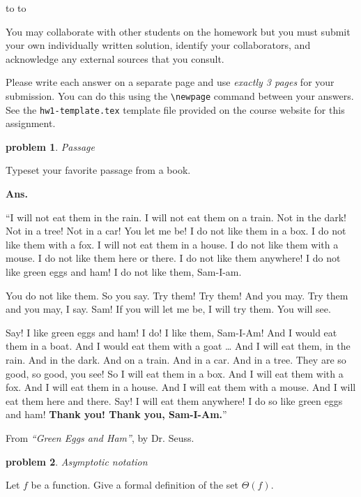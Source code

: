 \documentclass[11pt]{article}
\newcommand{\handout}{
   \renewcommand{\thepage}{H\hnumber-\arabic{page}}%
   \noindent%
   \begin{center}%
      \vbox{%
    \hbox to \columnwidth {\sc{\course} --- abhi shelat \hfill}%
    \vspace{-2mm}%
    \hbox to \columnwidth {\sc due \MakeLowercase{\duedate} \duelocation\hfill {\Huge\color{mdb}H\hnumber.\yourname}}%
      }
   \end{center}
   \vspace*{2mm}
}
\newtheorem{problem}{\sc\color{cit}problem}
\begin{document}
\handout

\noindent You may collaborate with other students on the homework but you must submit your own individually written solution, identify your collaborators, and acknowledge any external sources that you consult.

Please write each answer on a separate page and use \emph{exactly 3 pages} for your submission. You can do this using the \verb=\newpage= command between your answers.  See the \texttt{hw1-template.tex} template file provided on the course website for this assignment.

\begin{problem}Passage\end{problem}
\noindent Typeset your favorite passage from a book.

\hfill

\noindent \textbf{Ans.}
\hfill

``I will not eat them in the rain.
I will not eat them on a train.
Not in the dark! Not in a tree!
Not in a car! You let me be!
I do not like them in a box.
I do not like them with a fox.
I will not eat them in a house.
I do not like them with a mouse.
I do not like them here or there.
I do not like them anywhere!
I do not like green eggs and ham!
I do not like them, Sam-I-am.

You do not like them. So you say.
Try them! Try them! And you may.
Try them and you may, I say.
Sam! If you will let me be,
I will try them. You will see.

Say! I like green eggs and ham!
I do! I like them, Sam-I-Am!
And I would eat them in a boat.
And I would eat them with a goat \ldots
And I will eat them, in the rain.
And in the dark. And on a train.
And in a car. And in a tree.
They are so good, so good, you see!
So I will eat them in a box.
And I will eat them with a fox.
And I will eat them in a house.
And I will eat them with a mouse.
And I will eat them here and there.
Say! I will eat them anywhere!
I do so like green eggs and ham!
\textbf{Thank you! Thank you, Sam-I-Am.}''

\hfill

\noindent From \emph{``Green Eggs and Ham''}, by Dr. Seuss.

\newpage

\begin{problem}{Asymptotic notation}\end{problem}

\noindent Let $f$ be a function. Give a formal definition of the set  $\Theta(f)$.
\end{document}
